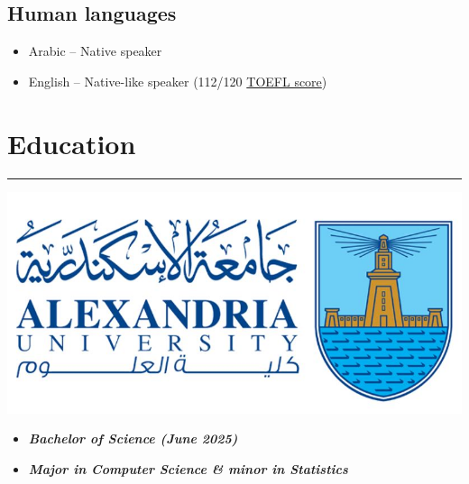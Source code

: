 \documentclass[10pt]{article}
\newcommand{\fancy}[1]{\Large\textbf{\textit{#1}}}
\begin{document}
\subsection*{\Large{Human languages}}
\begin{itemize}
	\item Arabic -- Native speaker
	\item English -- Native-like speaker (112/120 \href{https://drive.google.com/file/d/1S9nyRJj5tY12hFw3_XthDpG-YLtbXHaj/view?usp=sharing}{TOEFL score})
\end{itemize}




\section*{Education}
\hrule
\noindent

\begin{minipage}{0.3\textwidth}
	\vspace{1em}
	\begin{center}
		\includegraphics[width=\textwidth]{FOS_logo.jpg}
\end{center}
\end{minipage}
\begin{minipage}{0.7\textwidth}
\vspace{2em}
\begin{center}
    \begin{itemize}
        \item \large \fancy{Bachelor of Science (June 2025)}
    \end{itemize}
    \begin{itemize}
        \item \large \fancy{Major in Computer Science \& minor in Statistics}
    \end{itemize}
\end{center}
\end{minipage}
\end{document}
